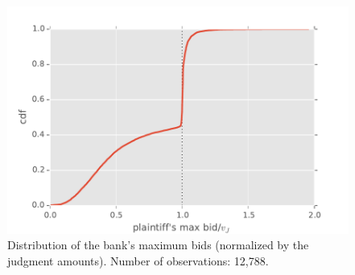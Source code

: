 \documentclass[11pt,twopage]{article}
\begin{document}


\begin{figure}[htbp]
	\centering
	\includegraphics[width=0.6 \textwidth]{graphics/distr-maxbid}%
	\caption{Distribution of the bank's maximum bids (normalized by the judgment amounts). Number of observations: 12,788.}
	\label{fig:public-reserve}
\end{figure}
\end{document}
